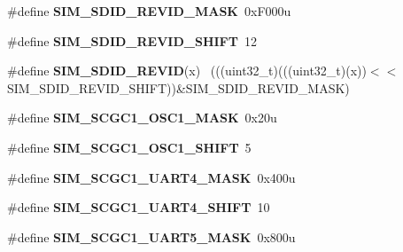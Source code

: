 \begin{DoxyCompactItemize}
\item 
\hypertarget{group___s_i_m___register___masks_gafefd91d0385c1b93049ec14409ed6b1e}{}\#define {\bfseries S\+I\+M\+\_\+\+S\+D\+I\+D\+\_\+\+R\+E\+V\+I\+D\+\_\+\+M\+A\+S\+K}~0x\+F000u\label{group___s_i_m___register___masks_gafefd91d0385c1b93049ec14409ed6b1e}

\item 
\hypertarget{group___s_i_m___register___masks_gadb535428e0ca83d2494493ed04822b8c}{}\#define {\bfseries S\+I\+M\+\_\+\+S\+D\+I\+D\+\_\+\+R\+E\+V\+I\+D\+\_\+\+S\+H\+I\+F\+T}~12\label{group___s_i_m___register___masks_gadb535428e0ca83d2494493ed04822b8c}

\item 
\hypertarget{group___s_i_m___register___masks_ga892bb65b3dc043087208ead1ea269b95}{}\#define {\bfseries S\+I\+M\+\_\+\+S\+D\+I\+D\+\_\+\+R\+E\+V\+I\+D}(x)                                            ~(((uint32\+\_\+t)(((uint32\+\_\+t)(x))$<$$<$S\+I\+M\+\_\+\+S\+D\+I\+D\+\_\+\+R\+E\+V\+I\+D\+\_\+\+S\+H\+I\+F\+T))\&S\+I\+M\+\_\+\+S\+D\+I\+D\+\_\+\+R\+E\+V\+I\+D\+\_\+\+M\+A\+S\+K)\label{group___s_i_m___register___masks_ga892bb65b3dc043087208ead1ea269b95}

\item 
\hypertarget{group___s_i_m___register___masks_ga6a468ba6127bd5328f0c6d7db0a7491a}{}\#define {\bfseries S\+I\+M\+\_\+\+S\+C\+G\+C1\+\_\+\+O\+S\+C1\+\_\+\+M\+A\+S\+K}~0x20u\label{group___s_i_m___register___masks_ga6a468ba6127bd5328f0c6d7db0a7491a}

\item 
\hypertarget{group___s_i_m___register___masks_gaa236e3bc71d0914241ea9e594f350a51}{}\#define {\bfseries S\+I\+M\+\_\+\+S\+C\+G\+C1\+\_\+\+O\+S\+C1\+\_\+\+S\+H\+I\+F\+T}~5\label{group___s_i_m___register___masks_gaa236e3bc71d0914241ea9e594f350a51}

\item 
\hypertarget{group___s_i_m___register___masks_ga8f954b824205f507499799ba8262b366}{}\#define {\bfseries S\+I\+M\+\_\+\+S\+C\+G\+C1\+\_\+\+U\+A\+R\+T4\+\_\+\+M\+A\+S\+K}~0x400u\label{group___s_i_m___register___masks_ga8f954b824205f507499799ba8262b366}

\item 
\hypertarget{group___s_i_m___register___masks_ga0808f41650f2b3824b779bf4f2273f08}{}\#define {\bfseries S\+I\+M\+\_\+\+S\+C\+G\+C1\+\_\+\+U\+A\+R\+T4\+\_\+\+S\+H\+I\+F\+T}~10\label{group___s_i_m___register___masks_ga0808f41650f2b3824b779bf4f2273f08}

\item 
\hypertarget{group___s_i_m___register___masks_ga6d5168e1b4f532ad0d6e3836dd5560f3}{}\#define {\bfseries S\+I\+M\+\_\+\+S\+C\+G\+C1\+\_\+\+U\+A\+R\+T5\+\_\+\+M\+A\+S\+K}~0x800u\label{group___s_i_m___register___masks_ga6d5168e1b4f532ad0d6e3836dd5560f3}


\end{DoxyCompactItemize}
